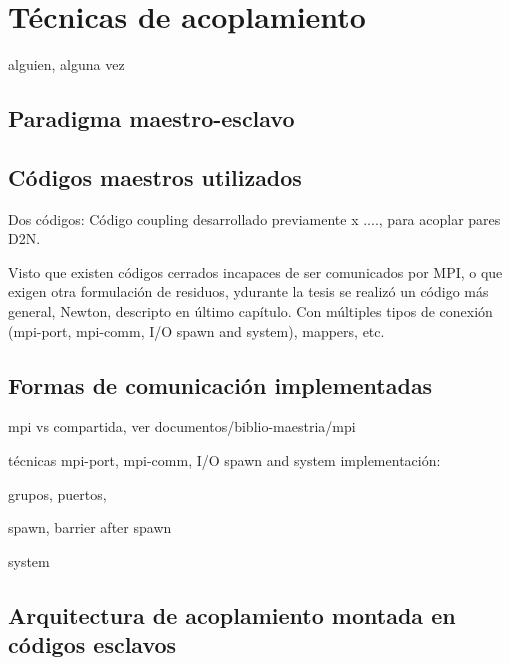 \chapter{Técnicas de acoplamiento}
\label{chap2}
\chapterquote
{}
{alguien, alguna vez}

\section{Paradigma maestro-esclavo}
\label{2:maestro-esclavo}

\section{Códigos maestros utilizados}
\label{2:maestros}
Dos códigos:
Código coupling desarrollado previamente x ...., para acoplar pares D2N.

Visto que existen códigos cerrados incapaces de ser comunicados por MPI, 
o que exigen otra formulación de residuos,
ydurante la tesis se realizó un código más general, Newton, descripto en último capítulo.
Con múltiples tipos de conexión (mpi-port, mpi-comm, I/O spawn and system),
mappers, etc.

\section{Formas de comunicación implementadas}
\label{2:comunicación}

mpi vs compartida, ver documentos/biblio-maestria/mpi

técnicas mpi-port, mpi-comm, I/O spawn and system
implementación: 

grupos, 
puertos, 

spawn,
barrier after spawn

system

\section{Arquitectura de acoplamiento montada en códigos esclavos}
\label{2:arquitectura}
